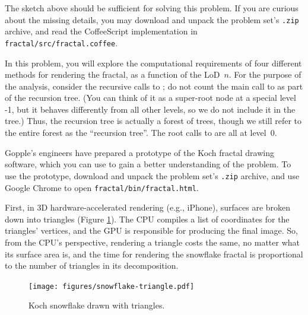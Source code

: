 \documentclass[12pt,twoside]{article}
\begin{document}
\begin{problems}
The sketch above should be sufficient for solving this problem. If you are
curious about the missing details, you may download and unpack the problem set's
\texttt{.zip} archive, and read the CoffeeScript implementation in
\texttt{fractal/src/fractal.coffee}.

In this problem, you will explore the computational requirements of four
different methods for rendering the fractal, as a function of the LoD~$n$.
For the purpose of the analysis, consider the recursive calls to
; do not count the main call to  as part
of the recursion tree.
(You can think of it as a super-root node at a special level -1, but it behaves 
differently from all other levels, so we do not include it in the tree.) Thus,
the recursion tree is actually a forest of trees, though we still refer to the
entire forest as the ``recursion tree''. The root calls to 
are all at level~$0$.

Gopple's engineers have prepared a prototype of the Koch fractal drawing
software, which you can use to gain a better understanding of the problem. To
use the prototype, download and unpack the problem set's \texttt{.zip} archive,
and use Google Chrome to open \texttt{fractal/bin/fractal.html}.



First, in 3D hardware-accelerated rendering (e.g., iPhone), surfaces are
broken down into triangles (Figure \ref{fig:snowflake-triangle}). The CPU
compiles a list of coordinates for the triangles' vertices, and the GPU
is responsible for producing the final image. So, from the CPU's
perspective, rendering a triangle costs the same, no matter what its surface
area is, and the time for rendering the snowflake fractal is proportional to the
number of triangles in its decomposition.

\begin{figure}[htbp]
\begin{center}
\texttt{[image: figures/snowflake-triangle.pdf]}
\end{center}
\caption{Koch snowflake drawn with triangles.}
\label{fig:snowflake-triangle}
\end{figure}


\end{problems}
\end{document}
